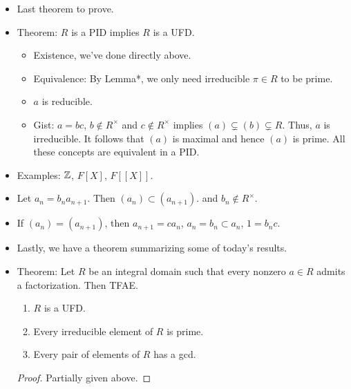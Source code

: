 \documentclass[../notes.tex]{subfiles}
\begin{document}
\begin{itemize}
\begin{itemize}
        \item Definition of an infinite union: There exists $n$ such that $\alpha\in I_n$. Therefore, $(\alpha)\subset I_n\subsetneq I_{n+1}\subset\cdots\subset(\alpha)$. It follows that the factorization is finite.
        \item See the proof in the book for clarification: Theorem \ref{trm:8.14} of \textcite{bib:DummitFoote}.
    \end{itemize}
    \item Last theorem to prove.
    \item Theorem: $R$ is a PID implies $R$ is a UFD.
    \begin{itemize}
        \item Existence, we've done directly above.
        \item Equivalence: By Lemma*, we only need irreducible $\pi\in R$ to be prime.
        \item $a$ is reducible.
        \item Gist: $a=bc$, $b\notin R^\times$ and $c\notin R^\times$ implies $(a)\subsetneq(b)\subsetneq R$. Thus, $a$ is irreducible. It follows that $(a)$ is maximal and hence $(a)$ is prime. All these concepts are equivalent in a PID.
    \end{itemize}
    \item Examples: $\mathbb{Z}$, $F[X]$, $F[[X]]$.
    \item Let $a_n=b_na_{n+1}$. Then $(a_n)\subset(a_{n+1})$. and $b_n\notin R^\times$.
    \item If $(a_n)=(a_{n+1})$, then $a_{n+1}=ca_n$, $a_n=b_n\subset a_n$, $1=b_nc$.
    \item Lastly, we have a theorem summarizing some of today's results.
    \item Theorem: Let $R$ be an integral domain such that every nonzero $a\in R$ admits a factorization. Then TFAE.
    \begin{enumerate}
        \item $R$ is a UFD.
        \item Every irreducible element of $R$ is prime.
        \item Every pair of elements of $R$ has a gcd.
    \end{enumerate}
    \begin{proof}
        Partially given above.
    \end{proof}
\end{itemize}
\end{document}
